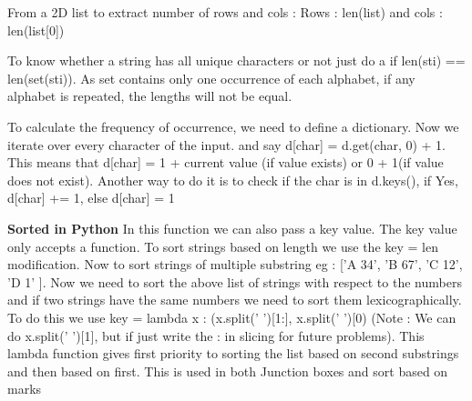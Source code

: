 \documentclass{article}
\newcommand{\nd}{\noindent}
\begin{document}
\nd From a 2D list to extract number of rows and cols : Rows : len(list) and cols : len(list[0])

\nd To know whether a string has all unique characters or not just do a if len(sti) == len(set(sti)). As set contains only one occurrence of each alphabet, if any alphabet is repeated, the lengths will not be equal. 

\nd To calculate the frequency of occurrence, we need to define a dictionary. Now we iterate over every character of the input. and say d[char] = d.get(char, 0) + 1. This means that d[char] = 1 + current value (if value exists) or 0 + 1(if value does not exist). Another way to do it is to check if the char is in d.keys(), if Yes, d[char] += 1, else d[char] = 1 

\nd \textbf{Sorted in Python} In this function we can also pass a key value. The key value only accepts a function. To sort strings based on length we use the key = len modification. Now to sort strings of multiple substring eg : ['A 34', 'B 67', 'C 12', 'D 1' ]. Now we need to sort the above list of strings with respect to the numbers and if two strings have the same numbers we need to sort them lexicographically. To do this we use key = lambda x : (x.split(' ')[1:], x.split(' ')[0) (Note : We can do x.split(' ')[1], but if just write the : in slicing for future problems). This lambda function gives first priority to sorting the list based on second substrings and then based on first. This is used in both Junction boxes and sort based on marks
\end{document}
